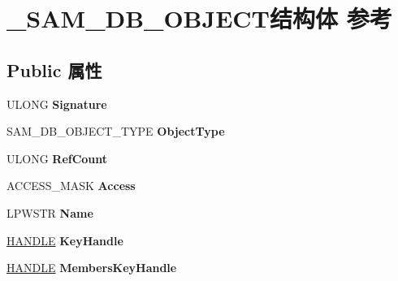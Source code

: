 \hypertarget{struct___s_a_m___d_b___o_b_j_e_c_t}{}\section{\+\_\+\+S\+A\+M\+\_\+\+D\+B\+\_\+\+O\+B\+J\+E\+C\+T结构体 参考}
\label{struct___s_a_m___d_b___o_b_j_e_c_t}
\subsection*{Public 属性}
\begin{DoxyCompactItemize}
\item 
\mbox{\label{struct___s_a_m___d_b___o_b_j_e_c_t_af781d1db1c0639b7196a71cfc1564f12}} 
U\+L\+O\+NG {\bfseries Signature}
\item 
\mbox{\label{struct___s_a_m___d_b___o_b_j_e_c_t_a7f88dcbf9c192a9d8d0c5fc342b06355}} 
S\+A\+M\+\_\+\+D\+B\+\_\+\+O\+B\+J\+E\+C\+T\+\_\+\+T\+Y\+PE {\bfseries Object\+Type}
\item 
\mbox{\label{struct___s_a_m___d_b___o_b_j_e_c_t_a6b5899440ecc432cce36584bded2c115}} 
U\+L\+O\+NG {\bfseries Ref\+Count}
\item 
\mbox{\label{struct___s_a_m___d_b___o_b_j_e_c_t_a7411315e989ad09173e58f56ba142f13}} 
A\+C\+C\+E\+S\+S\+\_\+\+M\+A\+SK {\bfseries Access}
\item 
\mbox{\label{struct___s_a_m___d_b___o_b_j_e_c_t_a02f047eb0c0ed134773dbcc5e50bf672}} 
L\+P\+W\+S\+TR {\bfseries Name}
\item 
\mbox{\label{struct___s_a_m___d_b___o_b_j_e_c_t_a1174ff2a23ac3519754af30ea24e0e50}} 
\hyperlink{interfacevoid}{H\+A\+N\+D\+LE} {\bfseries Key\+Handle}
\item 
\mbox{\label{struct___s_a_m___d_b___o_b_j_e_c_t_aaf1aa414a0fd0f7227d3ced8cf02d9cf}} 
\hyperlink{interfacevoid}{H\+A\+N\+D\+LE} {\bfseries Members\+Key\+Handle}
\item 

\end{DoxyCompactItemize}
